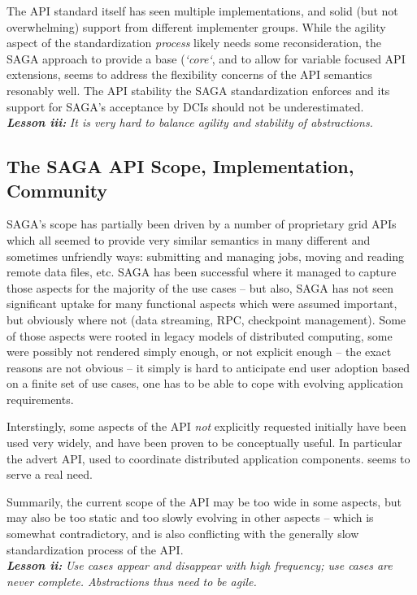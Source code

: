 \documentclass{article}
\newcommand{\I}[1]{\textit{#1}}
\newcommand{\BI}[1]{\textbf{\textit{#1}}}
\begin{document}
  The API standard itself has seen multiple implementations, and solid
  (but not overwhelming) support from different implementer groups.
  While the agility aspect of the standardization \I{process} likely
  needs some reconsideration, the SAGA approach to provide a base
  (\I{`core`}, and to allow for variable focused API extensions, seems
  to address the flexibility concerns of the API semantics resonably
  well.  The API stability the SAGA standardization enforces and its
  support for SAGA's acceptance by DCIs should not be underestimated.\\
  \BI{Lesson iii:} \I{It is very hard to balance agility and stability
  of abstractions.}


 \subsection{The SAGA API Scope, Implementation, Community}

  SAGA's scope has partially been driven by a number of proprietary grid APIs
  which all seemed to provide very similar semantics in many different and
  sometimes unfriendly ways: submitting and managing jobs, moving and reading
  remote data files, etc.  SAGA has been successful where it managed to capture
  those aspects for the majority of the use cases -- but also, SAGA has not seen
  significant uptake for many functional aspects which were assumed important,
  but obviously where not (data streaming, RPC, checkpoint management).  Some of
  those aspects were rooted in legacy models of distributed computing, some were
  possibly not rendered simply enough, or not explicit enough -- the exact
  reasons are not obvious -- it simply is hard to anticipate end user adoption
  based on a finite set of use cases, one has to be able to cope with evolving
  application requirements.

  Interstingly, some aspects of the API \I{not} explicitly requested initially
  have been used very widely, and have been proven to be conceptually useful.
  In particular the advert API, used to coordinate distributed application
  components. seems to serve a real need.

  Summarily, the current scope of the API may be too wide in some aspects, but
  may also be too static and too slowly evolving in other aspects -- which is
  somewhat contradictory, and is also conflicting with the generally slow
  standardization process of the API.\\
  \BI{Lesson ii:} \I{Use cases appear and disappear with high frequency; use
  cases are never complete.  Abstractions thus need to be agile.}
\end{document}
